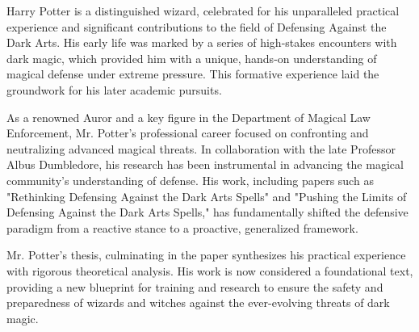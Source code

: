 \begin{biosketch}
Harry Potter is a distinguished wizard, celebrated for his unparalleled practical experience and significant contributions to the field of Defensing Against the Dark Arts. His early life was marked by a series of high-stakes encounters with dark magic, which provided him with a unique, hands-on understanding of magical defense under extreme pressure. This formative experience laid the groundwork for his later academic pursuits.

As a renowned Auror and a key figure in the Department of Magical Law Enforcement, Mr. Potter's professional career focused on confronting and neutralizing advanced magical threats. In collaboration with the late Professor Albus Dumbledore, his research has been instrumental in advancing the magical community's understanding of defense. His work, including papers such as "Rethinking Defensing Against the Dark Arts Spells" and "Pushing the Limits of Defensing Against the Dark Arts Spells," has fundamentally shifted the defensive paradigm from a reactive stance to a proactive, generalized framework.

Mr. Potter's thesis, culminating in the paper synthesizes his practical experience with rigorous theoretical analysis. His work is now considered a foundational text, providing a new blueprint for training and research to ensure the safety and preparedness of wizards and witches against the ever-evolving threats of dark magic.
\end{biosketch}
